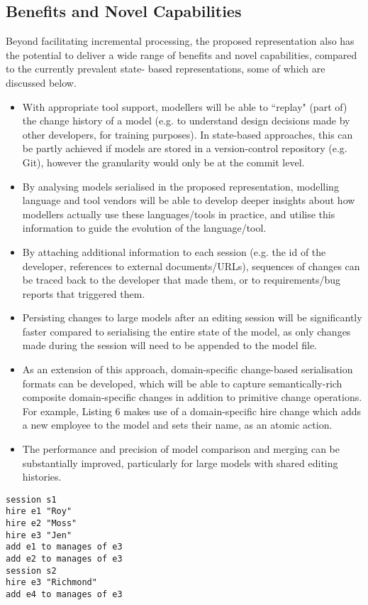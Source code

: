 \documentclass{llncs}
\begin{document}
\subsection{Benefits and Novel Capabilities}
Beyond facilitating incremental processing, the proposed representation also has the potential to
deliver a wide range of benefits and novel capabilities, compared to the currently prevalent state-
based representations, some of which are discussed below.
\begin{itemize}
\item With appropriate tool support, modellers will be able to ``replay" (part of) the change history of a
model (e.g. to understand design decisions made by other developers, for training purposes). In state-based approaches, this can be partly achieved if models are stored in a version-control repository (e.g. Git), however the granularity would only be at the commit level.
\item By analysing models serialised in the proposed representation, modelling language and tool vendors will be able to develop deeper insights about how modellers actually use these languages/tools in practice, and utilise this information to guide the evolution of the language/tool.
\item By attaching additional information to each session (e.g. the id of the developer, references to external documents/URLs), sequences of changes can be traced back to the developer that made them, or to requirements/bug reports that triggered them.
\item Persisting changes to large models after an editing session will be significantly faster compared
to serialising the entire state of the model, as only changes made during the session will need to be appended to the model file.
\item As an extension of this approach, domain-specific change-based serialisation formats can be developed, which will be able to capture semantically-rich composite domain-specific changes in addition to primitive change operations. For example, Listing 6 makes use of a domain-specific hire change which adds a new employee to the model and sets their name, as an atomic action.
\item The performance and precision of model comparison and merging can be substantially improved, particularly for large models with shared editing histories.
\end{itemize}

\begin{lstlisting}[style=cbp,caption={Language-specific change-based representation of the model of Figure 3.},label=cbpmodel2]
session s1
hire e1 "Roy"
hire e2 "Moss"
hire e3 "Jen"
add e1 to manages of e3
add e2 to manages of e3
session s2
hire e3 "Richmond"
add e4 to manages of e3
\end{lstlisting}
\end{document}
